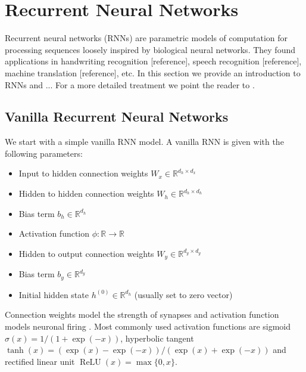 \documentclass[titlepage]{report}
\DeclareMathOperator{\relu}{ReLU}
\begin{document}
\section{Recurrent Neural Networks}

Recurrent neural networks (RNNs) \cite{rumelhart1985learning} are parametric models of computation for processing sequences loosely inspired by biological neural networks. They found applications in handwriting recognition [reference], speech recognition [reference], machine translation [reference], etc. In this section we provide an introduction to RNNs and ... For a more detailed treatment we point the reader to \cite{graves2012supervised}.

\subsection{Vanilla Recurrent Neural Networks}

We start with a simple vanilla RNN model. A vanilla RNN is given with the following parameters:

\begin{itemize}[itemsep = -2pt]
\item Input to hidden connection weights $W_x \in \mathbb{R}^{d_h \times d_x}$
\item Hidden to hidden connection weights $W_h \in \mathbb{R}^{d_h \times d_h}$
\item Bias term $b_h \in \mathbb{R}^{d_h}$
\item Activation function $\phi: \mathbb{R} \to \mathbb{R}$
\item Hidden to output connection weights $W_y \in \mathbb{R}^{d_y \times d_y}$
\item Bias term $b_y \in \mathbb{R}^{d_y}$
\item Initial hidden state $h^{(0)} \in \mathbb{R}^{d_h}$ (usually set to zero vector)
\end{itemize}

\noindent
Connection weights model the strength of synapses and activation function models neuronal firing \cite{llinas2008neuron}. Most commonly used activation functions are sigmoid $\sigma(x) = 1 / (1 + \exp(-x))$, hyperbolic tangent $\tanh(x) = (\exp(x) - \exp(-x)) / (\exp(x) + \exp(-x))$ and rectified linear unit $\relu(x) = \max \{ 0, x \}$.

\end{document}
